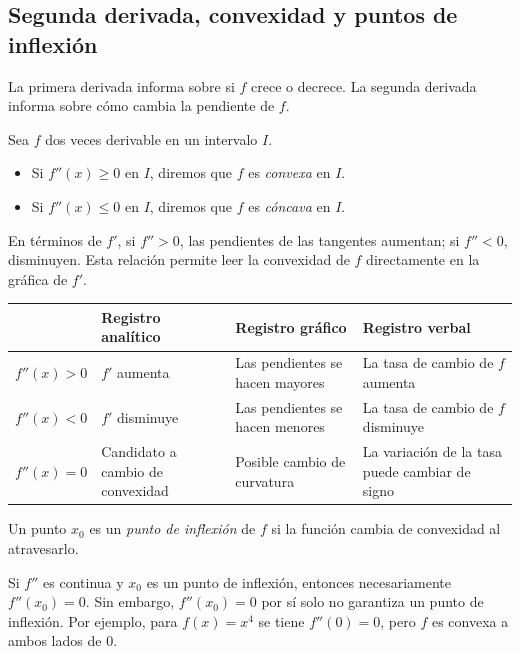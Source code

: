 \subsection{Segunda derivada, convexidad y puntos de inflexión}

La primera derivada informa sobre si $f$ crece o decrece. La segunda derivada informa sobre cómo cambia la pendiente de $f$.

\begin{definition}
Sea $f$ dos veces derivable en un intervalo $I$.
\begin{itemize}
\item Si $f''(x)\geq0$ en $I$, diremos que $f$ es \emph{convexa} en $I$.
\item Si $f''(x)\leq0$ en $I$, diremos que $f$ es \emph{cóncava} en $I$.
\end{itemize}
\end{definition}

En términos de $f'$, si $f''>0$, las pendientes de las tangentes aumentan; si $f''<0$, disminuyen. Esta relación permite leer la convexidad de $f$ directamente en la gráfica de $f'$.

\begin{center}
\renewcommand{\arraystretch}{1.45}
\begin{tabularx}{\textwidth}{@{}>{\bfseries}lXXX@{}}
\toprule
 & Registro analítico & Registro gráfico & Registro verbal \\
\midrule
$f''(x)>0$ & $f'$ aumenta & Las pendientes se hacen mayores & La tasa de cambio de $f$ aumenta \\
$f''(x)<0$ & $f'$ disminuye & Las pendientes se hacen menores & La tasa de cambio de $f$ disminuye \\
$f''(x)=0$ & Candidato a cambio de convexidad & Posible cambio de curvatura & La variación de la tasa puede cambiar de signo \\
\bottomrule
\end{tabularx}
\end{center}

\begin{definition}
Un punto $x_0$ es un \emph{punto de inflexión} de $f$ si la función cambia de convexidad al atravesarlo.
\end{definition}

Si $f''$ es continua y $x_0$ es un punto de inflexión, entonces necesariamente $f''(x_0)=0$. Sin embargo, $f''(x_0)=0$ por sí solo no garantiza un punto de inflexión. Por ejemplo, para $f(x)=x^4$ se tiene $f''(0)=0$, pero $f$ es convexa a ambos lados de $0$.

